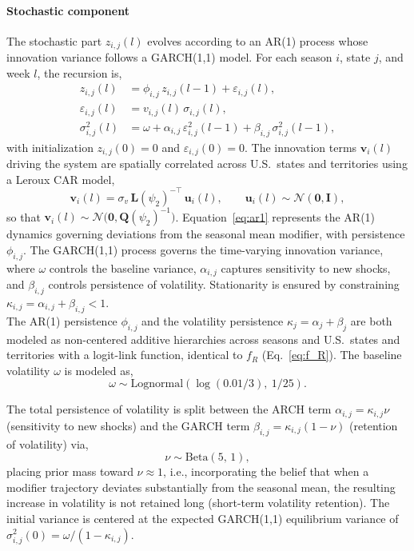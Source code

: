 \documentclass[11pt]{article}
\newcommand{\Normal}{\mathcal{N}}
\newcommand{\Lognormal}{\text{Lognormal}}
\begin{document}
\paragraph{Stochastic component}
The stochastic part $z_{i,j}(l)$ evolves according to an AR(1) process whose innovation variance follows a GARCH(1,1) model. For each season $i$, state $j$, and week $l$, the recursion is,
\begin{align}
	z_{i,j}(l) &= \phi_{i,j} \,z_{i,j}(l-1) + \varepsilon_{i,j}(l), \\ \label{eq:ar1}
	\varepsilon_{i,j}(l) &= v_{i,j}(l)\,\sigma_{i,j}(l), \\
    \sigma^2_{i,j}(l) &= \omega + \alpha_{i,j}\,\varepsilon^2_{i,j}(l-1) + \beta_{i,j}\,\sigma^2_{i,j}(l-1),
\end{align}
with initialization $z_{i,j}(0) = 0$ and $\varepsilon_{i,j}(0) = 0$. The innovation terms $\bm{v}_i(l)$ driving the system are spatially correlated across U.S.\ states and territories using a Leroux CAR model,
\begin{equation}
    \bm{v}_i(l) = \sigma_v \, \bm{L}(\psi_2)^{-\top}\, \bm{u}_i(l), 
    \qquad \bm{u}_i(l) \sim \Normal(\bm{0}, \bm{I}),
\end{equation}
so that $\bm{v}_i(l) \sim \Normal\big(\bm{0}, \bm{Q}(\psi_2)^{-1}\big)$. Equation~\eqref{eq:ar1} represents the AR(1) dynamics governing deviations from the seasonal mean modifier, with persistence $\phi_{i,j}$. The GARCH(1,1) process governs the time-varying innovation variance, where $\omega$ controls the baseline variance, $\alpha_{i,j}$ captures sensitivity to new shocks, and $\beta_{i,j}$ controls persistence of volatility. Stationarity is ensured by constraining $\kappa_{i,j} = \alpha_{i,j} + \beta_{i,j} < 1$.\\

The AR(1) persistence $\phi_{i,j}$ and the volatility persistence $\kappa_j = \alpha_j + \beta_j$ are both modeled as non-centered additive hierarchies across seasons and U.S.\ states and territories with a logit-link function, identical to $f_R$ (Eq.~\eqref{eq:f_R}). The baseline volatility $\omega$ is modeled as,
\begin{equation}
    \omega \sim \Lognormal\!\left(\log(0.01/3),\ 1/25\right).
\end{equation}

The total persistence of volatility is split between the ARCH term $\alpha_{i,j} = \kappa_{i,j} \nu$ (sensitivity to new shocks) and the GARCH term $\beta_{i,j} = \kappa_{i,j}(1-\nu)$ (retention of volatility) via,
\begin{equation}
    \nu \sim \text{Beta}(5,\, 1),
\end{equation}
placing prior mass toward $\nu \approx 1$, i.e., incorporating the belief that when a modifier trajectory deviates substantially from the seasonal mean, the resulting increase in volatility is not retained long (short-term volatility retention). The initial variance is centered at the expected GARCH(1,1) equilibrium variance of $\sigma^2_{i,j}(0) = \omega/(1-\kappa_{i,j})$.
\end{document}
